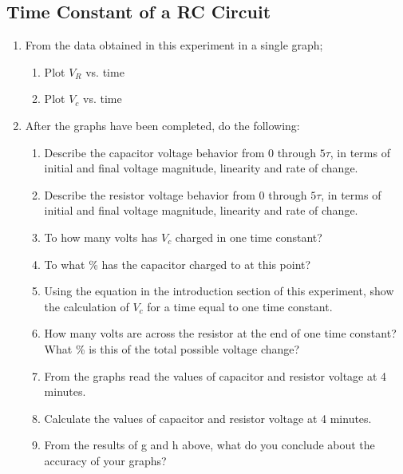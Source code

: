 \documentclass[a4paper]{article}
\begin{document}
\subsection{Time Constant of a RC Circuit}

\begin{enumerate}
    \item From the data obtained in this experiment in a single graph; \\
    \begin{enumerate}
        \item Plot $V_{R}$ vs. time \\
        \item Plot $V_{c}$ vs. time \\
    \end{enumerate}
    \item After the graphs have been completed, do the following: \\
    \begin{enumerate}
        \item Describe the capacitor voltage behavior from 0 through $5\tau$, in terms of initial and final voltage magnitude, linearity and rate of change. \\
        \item Describe the resistor voltage behavior from 0 through $5\tau$, in terms of initial and final voltage magnitude, linearity and rate of change. \\
        \item To how many volts has $V_{c}$ charged in one time constant?
        \item To what \% has the capacitor charged to at this point?
        \item Using the equation in the introduction section of this experiment, show the calculation of $V_{c}$ for a time equal to one time constant.
        \item How many volts are across the resistor at the end of one time constant? What \% is this of the total possible voltage change?
        \item From the graphs read the values of capacitor and resistor voltage at 4 minutes.
        \item Calculate the values of capacitor and resistor voltage at 4 minutes.
        \item From the results of g and h above, what do you conclude about the accuracy of your graphs?
    \end{enumerate}
\end{enumerate}
\end{document}
